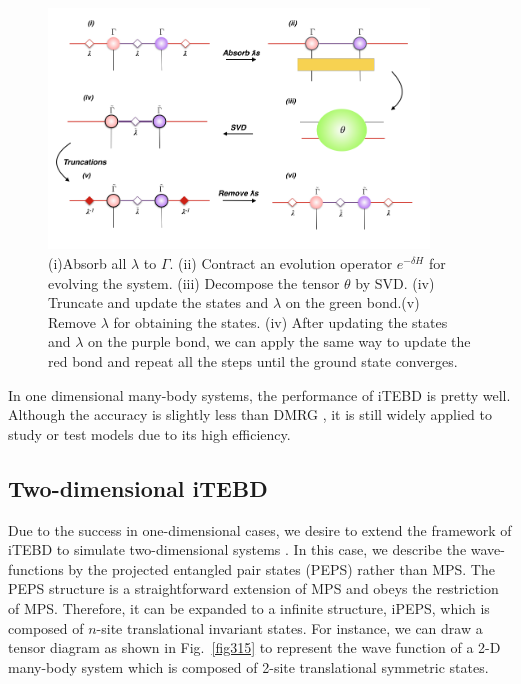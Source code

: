 \begin{figure}[ht]
	\centering
	\includegraphics[width=0.90\textwidth]{figures/fig313.png}
	\caption[The tensor network diagrams for the 1-D iTEBD]{ (i)Absorb all $\lambda$ to $\Gamma$. (ii) Contract an evolution operator $e^{-\delta H}$ for evolving the system. (iii) Decompose the tensor $\theta$ by SVD. (iv) Truncate and update the states and $\lambda$ on the green bond.(v) Remove $
		\lambda$ for obtaining the states. (iv) After updating the states and $\lambda$ on the purple bond, we can apply the same way to update the red bond and repeat all the steps until the ground state converges.}
	\label{fig314}
\end{figure}

In one dimensional many-body systems, the performance of iTEBD is pretty well. Although the accuracy is slightly less than DMRG \cite{PhysRevB.48.10345}, it is still widely applied to study or test models due to its high efficiency.

\subsection{Two-dimensional iTEBD}
\label{2ditebd}

Due to the success in one-dimensional cases, we desire to extend the framework of iTEBD to simulate two-dimensional systems . In this case, we describe the wave-functions by the projected entangled pair states (PEPS) rather than MPS. The PEPS structure is a straightforward extension of MPS and obeys the restriction of MPS. Therefore, it can be expanded to a infinite structure, iPEPS, which is composed of $n$-site translational invariant states. For instance, we can draw a tensor diagram as shown in Fig.~\ref{fig315} to represent the wave function of a 2-D many-body system which is composed of 2-site translational symmetric states.

